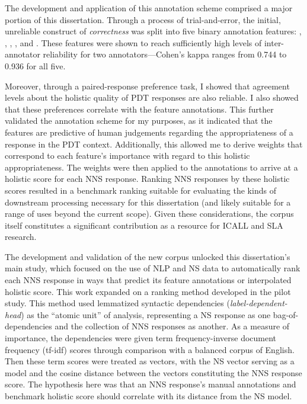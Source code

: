 The development and application of this annotation scheme comprised a major portion of this dissertation. Through a process of trial-and-error, the initial, unreliable construct of \textit{correctness} was split into five binary annotation features: , , , , and . These features were shown to reach sufficiently high levels of inter-annotator reliability for two annotators---Cohen's kappa ranges from 0.744 to 0.936 for all five.

Moreover, through a paired-response preference task, I showed that agreement levels about the holistic quality of PDT responses are also reliable. I also showed that these preferences correlate with the feature annotations. This further validated the annotation scheme for my purposes, as it indicated that the features are predictive of human judgements regarding the appropriateness of a response in the PDT context. Additionally, this allowed me to derive weights that correspond to each feature's importance with regard to this holistic appropriateness. The weights were then applied to the annotations to arrive at a holistic score for each NNS response. Ranking NNS responses by these holistic scores resulted in a benchmark ranking suitable for evaluating the kinds of downstream processing necessary for this dissertation (and likely suitable for a range of uses beyond the current scope).
Given these considerations, the corpus itself constitutes a significant contribution as a resource for ICALL and SLA research.

The development and validation of the new corpus unlocked this dissertation's main study, which focused on the use of NLP and NS data to automatically rank each NNS response in ways that predict its feature annotations or interpolated holistic score. This work expanded on a ranking method developed in the pilot study. This method used lemmatized syntactic dependencies (\textit{label-dependent-head}) as the ``atomic unit'' of analysis, representing a NS response as one bag-of-dependencies and the collection of NNS responses as another. As a measure of importance, the dependencies were given term frequency-inverse document frequency (tf-idf) scores through comparison with a balanced corpus of English. Then these term scores were treated as vectors, with the NS vector serving as a model and the cosine distance between the vectors constituting the NNS response score. The hypothesis here was that an NNS response's manual annotations and benchmark holistic score should correlate with its distance from the NS model.

